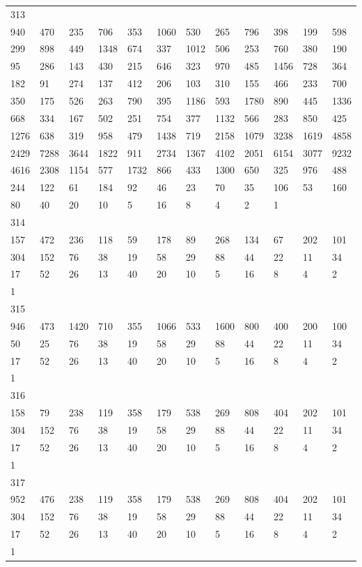 \begin{longtable}{llllllllllll}
313&&&&&&&&&&&\\
940& 470& 235& 706& 353& 1060& 530& 265& 796& 398& 199& 598\\
299& 898& 449& 1348& 674& 337& 1012& 506& 253& 760& 380& 190\\
95& 286& 143& 430& 215& 646& 323& 970& 485& 1456& 728& 364\\
182& 91& 274& 137& 412& 206& 103& 310& 155& 466& 233& 700\\
350& 175& 526& 263& 790& 395& 1186& 593& 1780& 890& 445& 1336\\
668& 334& 167& 502& 251& 754& 377& 1132& 566& 283& 850& 425\\
1276& 638& 319& 958& 479& 1438& 719& 2158& 1079& 3238& 1619& 4858\\
2429& 7288& 3644& 1822& 911& 2734& 1367& 4102& 2051& 6154& 3077& 9232\\
4616& 2308& 1154& 577& 1732& 866& 433& 1300& 650& 325& 976& 488\\
244& 122& 61& 184& 92& 46& 23& 70& 35& 106& 53& 160\\
80& 40& 20& 10& 5& 16& 8& 4& 2& 1& \\

314&&&&&&&&&&&\\
157& 472& 236& 118& 59& 178& 89& 268& 134& 67& 202& 101\\
304& 152& 76& 38& 19& 58& 29& 88& 44& 22& 11& 34\\
17& 52& 26& 13& 40& 20& 10& 5& 16& 8& 4& 2\\
1& \\

315&&&&&&&&&&&\\
946& 473& 1420& 710& 355& 1066& 533& 1600& 800& 400& 200& 100\\
50& 25& 76& 38& 19& 58& 29& 88& 44& 22& 11& 34\\
17& 52& 26& 13& 40& 20& 10& 5& 16& 8& 4& 2\\
1& \\

316&&&&&&&&&&&\\
158& 79& 238& 119& 358& 179& 538& 269& 808& 404& 202& 101\\
304& 152& 76& 38& 19& 58& 29& 88& 44& 22& 11& 34\\
17& 52& 26& 13& 40& 20& 10& 5& 16& 8& 4& 2\\
1& \\

317&&&&&&&&&&&\\
952& 476& 238& 119& 358& 179& 538& 269& 808& 404& 202& 101\\
304& 152& 76& 38& 19& 58& 29& 88& 44& 22& 11& 34\\
17& 52& 26& 13& 40& 20& 10& 5& 16& 8& 4& 2\\
1& \\


\end{longtable}

